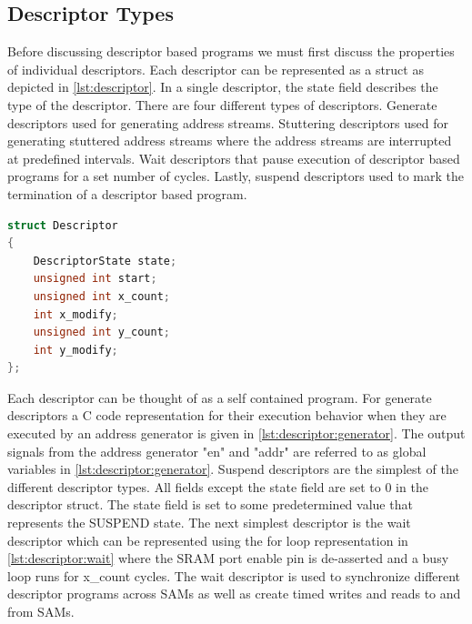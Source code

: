 \subsection{Descriptor Types}
\label{chap:sams:descriptor_types}


Before discussing descriptor based programs we must first discuss the properties
of individual descriptors. Each descriptor can be represented as a struct as
depicted in \autoref{lst:descriptor}. In a single descriptor, the state field
describes the type of the descriptor. There are four different types of
descriptors. Generate descriptors used for generating address streams.
Stuttering descriptors used for generating stuttered address streams where the
address streams are interrupted at predefined intervals. Wait descriptors that
pause execution of descriptor based programs for a set number of cycles. Lastly,
suspend descriptors used to mark the termination of a descriptor based program.

\begin{lstlisting}[language=C, caption=Descriptor Struct, label={lst:descriptor}]
struct Descriptor
{
    DescriptorState state; 
    unsigned int start;
    unsigned int x_count;
    int x_modify;
    unsigned int y_count;
    int y_modify;
};
\end{lstlisting}

Each descriptor can be thought of as a self contained program. For generate
descriptors a C code representation for their execution behavior when they are executed
by an address generator is given in \autoref{lst:descriptor:generator}. The
output signals from the address generator "en" and "addr" are referred to as
global variables in \autoref{lst:descriptor:generator}. Suspend descriptors are
the simplest of the different descriptor types. All fields except the state
field are set to 0 in the descriptor struct. The state field is set to some
predetermined value that represents the SUSPEND state. The next simplest
descriptor is the wait descriptor which can be represented using the for loop
representation in \autoref{lst:descriptor:wait} where the SRAM port enable pin is
de-asserted and a busy loop runs for x\_count cycles. The wait descriptor is used
to synchronize different descriptor programs across SAMs as well as create timed
writes and reads to and from SAMs.

